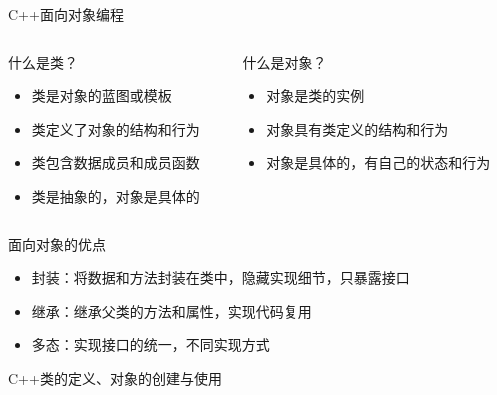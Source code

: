 \documentclass[UTF8,aspectratio=169]{beamer}
\begin{document}
\begin{frame}{C++面向对象编程}
    \begin{columns}
        \begin{column}{0.48\textwidth}
    \begin{ytublock}{什么是类？}
        \begin{itemize}
            \item 类是对象的蓝图或模板
            \item 类定义了对象的结构和行为
            \item 类包含数据成员和成员函数
            \item 类是抽象的，对象是具体的
        \end{itemize}
    \end{ytublock}
    \end{column}
    \begin{column}{0.48\textwidth}
    \begin{ytublock}{什么是对象？}
        \begin{itemize}
            \item 对象是类的实例
            \item 对象具有类定义的结构和行为
            \item 对象是具体的，有自己的状态和行为
        \end{itemize}
    \end{ytublock}
    \end{column}
    \end{columns}
    \begin{ytublock}{面向对象的优点}
        \begin{itemize}
            \item 封装：将数据和方法封装在类中，隐藏实现细节，只暴露接口
            \item 继承：继承父类的方法和属性，实现代码复用
            \item 多态：实现接口的统一，不同实现方式
        \end{itemize}
    \end{ytublock}
\end{frame}

\begin{frame}[fragile]{C++类的定义、对象的创建与使用}
        \begin{columns}
            \begin{column}{0.48\textwidth}
                \inputminted[firstline=1,lastline=16]{cpp}{code/cpp_class_example.cpp}
            \end{column}
            \begin{column}{0.48\textwidth}
                \inputminted[firstline=18,lastline=30]{cpp}{code/cpp_class_example.cpp}
            \end{column}
        \end{columns}
\end{frame}
\end{document}
